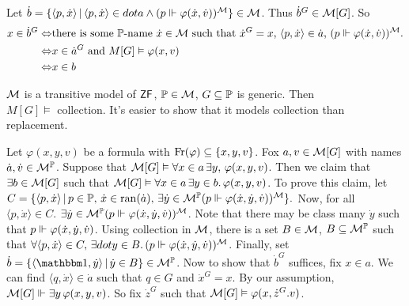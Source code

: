 \documentclass{article}
\begin{document}
    Let $\dot{b} = \{ \langle p, \dot{x} \rangle \, | \, \langle p, \dot{x} \rangle \in dot{a} \wedge (p \Vdash \varphi(\dot{x}, \dot{v}))^{\mathcal{M}}\} \in \mathcal{M}$. Thus $\dot{b}^{G} \in \mathcal{M}[G]$. \gap
    So \begin{align*}
        x \in \dot{b}^{G} \Leftrightarrow & \text{there is some $\mathbb{P}$-name $\dot{x} \in \mathcal{M}$ such that $\dot{x}^{G}=x$, $\langle p, \dot{x} \rangle \in \dot{a}$, $(p \Vdash \varphi(\dot{x},\dot{v}))^{\mathcal{M}}$.} \\
        \Leftrightarrow                   & x \in \dot{a}^{G} \text{ and } M[G] \vDash \varphi(x,v)                                                                                                                  \\
        \Leftrightarrow                   & x \in b
    \end{align*}
    \endproof
    \begin{fancylem}{}
        $\mathcal{M}$ is a transitive model of $\mathsf{ZF}$, $\mathbb{P} \in \mathcal{M}$, $G \subseteq \mathbb{P}$ is generic. Then $M[G] \models \text{ collection}$. It's easier to show that it models collection than replacement.
    \end{fancylem}
    Let $\varphi(x,y,v)$ be a formula with $\operatorname{Fr}(\varphi) \subseteq \{x,y,v\}$. Fox $a,v \in \mathcal{M}[G]$ with names $\dot{a}, \dot{v} \in \mathcal{M}^{\mathbb{P}}$.\gap
    Suppose that $\mathcal{M}[G] \vDash \forall x \in a \, \exists y, \, \varphi(x,y,v)$. \gap
    Then we claim that $\exists b \in \mathcal{M}[G]$ such that $\mathcal{M}[G] \vDash \forall x \in a \, \exists y \in b. \, \varphi(x,y,v)$. To prove this claim, let $C = \{ \langle p, \dot{x} \rangle \, | \, p \in \mathbb{P}, \, \dot{x} \in \operatorname{ran}(\dot{a}), \, \exists \dot{y} \in \mathcal{M}^{\mathbb{P}} (p \Vdash \varphi(\dot{x},\dot{y},\dot{v}))^{\mathcal{M}}\}.$ Now, for all $\langle p, \dot{x} \rangle \in C$. $\exists \dot{y} \in \mathcal{M}^{\mathbb{P}} (p \Vdash \varphi(\dot{x},\dot{y},\dot{v}))^{\mathcal{M}}$. \gap
    Note that there may be class many $\dot{y}$ such that $p \Vdash \varphi(\dot{x},\dot{y},\dot{v})$. Using collection in $\mathcal{M}$, there is a set $B \in \mathcal{M}$, $B \subseteq \mathcal{M}^{\mathbb{P}}$ such that $\forall \langle p, \dot{x} \rangle \in C, \, \exists dot{y} \in B. \, (p \Vdash \varphi(\dot{x}, \dot{y}, \dot{v}))^{\mathcal{M}}$. Finally, set $\dot{b} = \{\langle \bbone, \dot{y} \rangle \, | \, \dot{y} \in B\} \in \calM^{\bbP}$. Now to show that $\dot{b}^{G}$ suffices, fix $x \in a$. We can find $\langle q, \dot{x} \rangle \in \dot{a}$ such that $q \in G$ and $\dot{x}^{G} =x$. By our assumption, $\mathcal{M}[G] \Vdash \exists y \, \varphi(x,y,v)$. So fix $\dot{z}^{G}$ such that $\mathcal{M}[G] \vDash \varphi(x, \dot{z}^{G}. v)$. \gap
\end{document}
